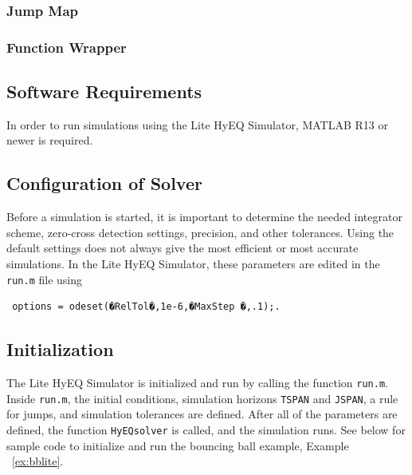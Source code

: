 \documentclass{article}
\newcommand{\ricardo}[1]{{\color{blue} #1}}
\begin{document}
\label{scr:zeroevents}

\subsubsection{Jump Map}
\label{sec:jumpmap}

\label{scr:jump}

\subsubsection{Function Wrapper}
\label{sec:funwrapp}

\label{scr:funwrapp}

\subsection{Software Requirements}

In order to run simulations using the Lite HyEQ Simulator, MATLAB R13 or newer is required.

\subsection{Configuration of Solver}

Before a simulation is started, it is important to determine the needed integrator scheme, zero-cross detection settings, precision, and other tolerances. Using the default settings does not always give the most efficient or most accurate simulations.
In the Lite HyEQ Simulator, these parameters are edited in the {\tt run.m} file using

\begin{verbatim} options = odeset(�RelTol�,1e-6,�MaxStep �,.1);. \end{verbatim}

\subsection{Initialization}


The Lite HyEQ Simulator is initialized and run by calling the function {\tt run.m}. Inside {\tt run.m}, the initial conditions, simulation horizons {\tt TSPAN} and {\tt JSPAN}, a rule for jumps, and simulation tolerances are defined. After all of the parameters are defined, the function {\tt HyEQsolver} is called, and the simulation runs. See below for sample code to initialize and run the bouncing ball example, Example ~\ref{ex:bblite}.\\
\end{document}
